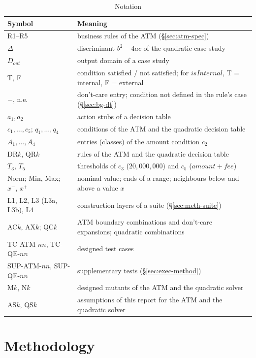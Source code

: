 \documentclass[11pt,a4paper]{article}
\newcommand{\Norm}{\mathrm{Norm}}
\begin{document}
\begin{table}[H]
\centering
\caption{Notation}
\label{tab:notation}
\small
\begin{tabularx}{\textwidth}{l Y}
\toprule
Symbol & Meaning \\
\midrule
R1--R5 & business rules of the ATM (\S\ref{sec:atm-spec}) \\
\(\Delta\) & discriminant \(b^2-4ac\) of the quadratic case study \\
\(D_{out}\) & output domain of a case study \\
T, F & condition satisfied / not satisfied; for \(\mathit{isInternal}\), T = internal, F = external \\
\(-\), n.e. & don't-care entry; condition not defined in the rule's case (\S\ref{sec:bg-dt}) \\
\(a_1, a_2\) & action stubs of a decision table \\
\(c_1,\dots,c_5\); \(q_1,\dots,q_4\) & conditions of the ATM and the quadratic decision table \\
\(A_1,\dots,A_4\) & entries (classes) of the amount condition \(c_2\) \\
DR\(k\), QR\(k\) & rules of the ATM and the quadratic decision table \\
\(T_3\), \(T_5\) & thresholds of \(c_3\) (\(20{,}000{,}000\)) and \(c_5\) (\(\mathit{amount}+\mathit{fee}\)) \\
\(\Norm\); Min, Max; \(x^-\), \(x^+\) & nominal value; ends of a range; neighbours below and above a value \(x\) \\
L1, L2, L3 (L3a, L3b), L4 & construction layers of a suite (\S\ref{sec:meth-suite}) \\
AC\(k\), AX\(k\); QC\(k\) & ATM boundary combinations and don't-care expansions; quadratic combinations \\
TC-ATM-\(nn\), TC-QE-\(nn\) & designed test cases \\
SUP-ATM-\(nn\), SUP-QE-\(nn\) & supplementary tests (\S\ref{sec:exec-method}) \\
M\(k\), N\(k\) & designed mutants of the ATM and the quadratic solver \\
AS\(k\), QS\(k\) & assumptions of this report for the ATM and the quadratic solver \\
\bottomrule
\end{tabularx}
\end{table}
\section{Methodology}
\label{sec:method}
\end{document}
